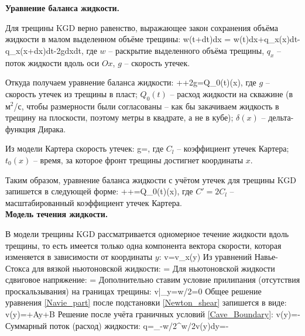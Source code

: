 \textbf{Уравнение баланса жидкости.}

Для трещины KGD верно равенство, выражающее закон сохранения объёма жидкости в малом выделенном объёме трещины:
\beq
w(t+dt)dx = w(t)dx+q_x(x)dt-q_x(x+dx)dt-2gdxdt,
\eeq
где $w$ -- раскрытие выделенного объёма трещины,
$q_x$ -- поток жидкости вдоль оси $Ox$,
$g$ -- скорость утечек.

Откуда получаем уравнение баланса жидкости:
\beq
{}++2g=Q_0(t)\delta(x),
\eeq
где $g$ -- скорость утечек из трещины в пласт;
$Q_0(t)$ -- расход жидкости на скважине (в м$^2$/с, чтобы размерности были согласованы -- как бы закачиваем жидкость в трещину на плоскости, поэтому метры в квадрате, а не в кубе);
$\delta(x)$ -- дельта-функция Дирака.

Из модели Картера \cite{karter} скорость утечек:
\beq
g=,
\eeq
где $C_l$ -- коэффициент утечек Картера;
$t_0(x)$ -- время, за которое фронт трещины достигнет координаты $x$.

Таким образом, уравнение баланса жидкости с учётом утечек для трещины KGD запишется в следующей форме:
\beq
{}++=Q_0(t)\delta(x),
\eeq
где $C'=2C_l$ -- масштабированный коэффициент утечек Картера.\\

\textbf{Модель течения жидкости.}

В модели трещины KGD рассматривается одномерное течение жидкости вдоль трещины, то есть имеется только одна компонента вектора скорости, которая изменяется в зависимости от координаты $y$:
\beq
v=v_x(y)
\eeq
Из уравнений Навье-Стокса для вязкой ньютоновской жидкости:
\beq\label{Navie_part}
=
\eeq
Для ньютоновской жидкости сдвиговое напряжение:
\beq\label{Newton_shear}
\tau = \mu{}
\eeq
Дополнительно ставим условие прилипания (отсутствия проскальзывания) на границах трещины:
\beq\label{Cave_Boundary}
v|_{y=\pm w/2}=0
\eeq
Общее решение уравнения \eqref{Navie_part} после подстановки \eqref{Newton_shear} запишется в виде:
\beq
v(y)=+Ay+B
\eeq
Решение после учёта граничных условий \eqref{Cave_Boundary}:
\beq
v(y)=-
\eeq
Суммарный поток (расход) жидкости:
\beq
q=\int\limits_{-w/2}^{w/2}v(y)dy=-
\eeq

